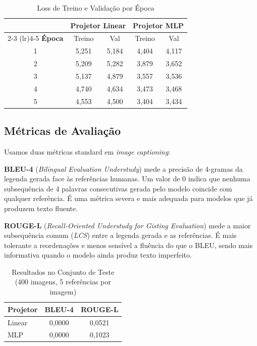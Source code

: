 \documentclass[conference]{IEEEtran}
\begin{document}
\begin{table}[htbp]
\caption{Loss de Treino e Validação por Época}
\begin{center}
\begin{tabular}{ccccc}
\toprule
 & \multicolumn{2}{c}{\textbf{Projetor Linear}} & \multicolumn{2}{c}{\textbf{Projetor MLP}} \\
\cmidrule(lr){2-3} \cmidrule(lr){4-5}
\textbf{Época} & Treino & Val & Treino & Val \\
\midrule
1 & 5,251 & 5,184 & 4,404 & 4,117 \\
2 & 5,209 & 5,282 & 3,879 & 3,652 \\
3 & 5,137 & 4,879 & 3,557 & 3,536 \\
4 & 4,740 & 4,634 & 3,473 & 3,468 \\
5 & 4,553 & 4,500 & 3,404 & 3,434 \\
\bottomrule
\end{tabular}
\label{tab:loss}
\end{center}
\end{table}

\subsection{Métricas de Avaliação}

Usamos duas métricas standard em \textit{image captioning}:

\textbf{BLEU-4} (\textit{Bilingual Evaluation Understudy}) mede a precisão de 4-gramas da legenda gerada face às referências humanas. Um valor de 0 indica que nenhuma subsequência de 4 palavras consecutivas gerada pelo modelo coincide com qualquer referência. É uma métrica severa e mais adequada para modelos que já produzem texto fluente.

\textbf{ROUGE-L} (\textit{Recall-Oriented Understudy for Gisting Evaluation}) mede a maior subsequência comum (\textit{LCS}) entre a legenda gerada e as referências. É mais tolerante a reordenações e menos sensível a fluência do que o BLEU, sendo mais informativa quando o modelo ainda produz texto imperfeito.

\begin{table}[htbp]
\caption{Resultados no Conjunto de Teste (400 imagens, 5 referências por imagem)}
\begin{center}
\begin{tabular}{lcc}
\toprule
\textbf{Projetor} & \textbf{BLEU-4} & \textbf{ROUGE-L} \\
\midrule
Linear & 0,0000 & 0,0521 \\
MLP    & 0,0000 & 0,1023 \\
\bottomrule
\end{tabular}
\label{tab:results}
\end{center}
\end{table}
\end{document}
